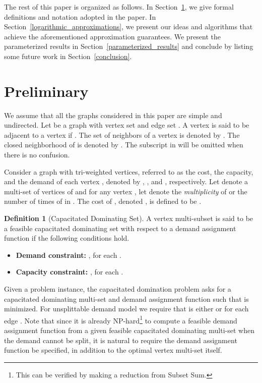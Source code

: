 \documentclass[a4paper,11pt]{article}
\theoremstyle{definition}
\newtheorem{definition}{Definition}
\begin{document}
\smallskip

The rest of this paper is organized as follows. In Section~\ref{preliminary}, we give formal definitions and notation adopted in the paper. In Section~\ref{logarithmic_approximations}, we present our ideas and algorithms that achieve the aforementioned approximation guarantees. We present the parameterized results in Section~\ref{parameterized_results} and conclude by listing some future work in Section~\ref{conclusion}.



\section{Preliminary} \label{preliminary}

We assume that all the graphs considered in this paper are simple and undirected. Let  be a graph with vertex set  and edge set . A vertex  is said to be adjacent to a vertex  if . The set of neighbors of a vertex  is denoted by . The closed neighborhood of  is denoted by .  The subscript  in  will be omitted when there is no confusion.

\smallskip

Consider a graph  with tri-weighted vertices, referred to as the cost, the capacity, and the demand of each vertex , denoted by , , and , respectively. Let  denote a multi-set of vertices of  and for any vertex , let  denote the {\it multiplicity} of  or the number of times of  in .
The cost of , denoted , is defined to be .

\begin{definition}[Capacitated Dominating Set]
A vertex multi-subset  is said to be a feasible capacitated dominating set with respect to a demand assignment function  if the following conditions hold.
\begin{itemize}
    \item {\bf Demand constraint:} , for each .
    \item {\bf Capacity constraint:} , for each .
\end{itemize}
\end{definition}

Given a problem instance, the capacitated domination problem asks for a capacitated dominating multi-set  and demand assignment function  such that  is minimized. For unsplittable demand model we require that  is either  or  for each edge . Note that since it is already NP-hard\footnote{This can be verified by making a reduction from {\sc Subset Sum}.} to compute a feasible demand assignment function from a given feasible capacitated dominating multi-set when the demand cannot be split, it is natural to require the demand assignment function be specified, in addition to the optimal vertex multi-set itself.
\end{document}
